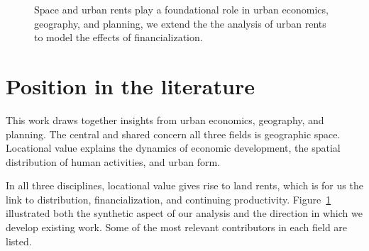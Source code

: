 \begin{figure}[!h]

    \caption{Space and urban rents play a foundational role in urban economics, geography, and planning, we extend the the analysis of urban rents to model the effects of financialization.} %
    \label{fig-fields}
\end{figure}

\section{Position in the literature}
This work draws together insights from urban economics, geography, and planning. The central and shared concern all three fields is geographic space. Locational value explains the dynamics of economic development, the spatial distribution of human activities, and urban form.  %

In all three disciplines, locational value gives rise to land rents, which is for us the link to distribution, financialization, and continuing productivity.  
Figure~\ref{fig-fields} illustrated both the synthetic aspect of our analysis and the direction in which we develop existing  work. Some of the most relevant contributors in each field are listed. %

